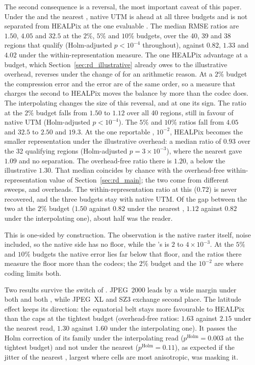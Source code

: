 The second consequence is a reversal, the most important caveat of this
paper. Under the  and the nearest , native UTM is
ahead at all three budgets and is not separated from HEALPix at the one
evaluable . The
median RMSE ratios are $1.50$, $4.05$ and $32.5$ at the $2\%$, $5\%$ and
$10\%$ budgets, over the 40, 39 and 38 regions that qualify
(Holm-adjusted $p<10^{-4}$ throughout), against $0.82$, $1.33$ and $4.02$
under the within-representation measure. The one HEALPix advantage at a budget, which
Section~\ref{sec:rd_illustrative} already owes to the illustrative
overhead, reverses under the change
of  for an arithmetic reason. At a $2\%$ budget the compression
error and the  error are of the same order, so a measure that
charges the second to HEALPix moves the balance by more than the codec
does. The interpolating  changes the size of this reversal, and at
one  its sign. The ratio at the $2\%$ budget falls from $1.50$ to
$1.12$ over all 40 regions, still in favour of native UTM (Holm-adjusted
$p<10^{-4}$). The $5\%$ and $10\%$ ratios fall from $4.05$ and $32.5$
to $2.50$ and $19.3$. At the one reportable , $10^{-2}$,
HEALPix becomes the smaller representation under the illustrative
overhead: a median ratio of $0.93$ over the 32 qualifying regions
(Holm-adjusted $p=3\times10^{-3}$), where the nearest  gave $1.09$
and no separation. The overhead-free ratio there is
$1.20$, a  below the illustrative $1.30$. That median
coincides by chance with the overhead-free within-representation value
of Section~\ref{sec:rd_main}; the two come from different sweeps,
 and overheads. The within-representation ratio at this
 ($0.72$) is never recovered, and the three budgets stay with
native UTM. Of the gap between the two  at the $2\%$ budget
($1.50$ against $0.82$ under the nearest , $1.12$ against $0.82$
under the interpolating one), about half was the reader.

This  is one-sided by construction. The observation is
the native raster itself, noise included, so the native side has no
floor, while the 's is $2$ to $4\times10^{-3}$. At the
$5\%$ and $10\%$ budgets the native error lies far below that floor, and
the ratios there measure the floor more than the codecs; the $2\%$
budget and the $10^{-2}$  are where coding
limits both.

Two results survive the switch of . JPEG~2000 leads by a wide
margin under both  and both , while JPEG~XL and SZ3
exchange second place. The latitude effect keeps its
direction: the equatorial belt stays more favourable to HEALPix than the
caps at the tightest budget (overhead-free ratios:
$1.63$ against $2.15$ under the nearest read, $1.30$ against $1.60$ under the interpolating one).
It passes the Holm correction of its family under the interpolating
read ($p^{\mathrm{Holm}}=0.003$ at the tightest budget) and not under the
nearest ($p^{\mathrm{Holm}}=0.11$), as expected if the jitter of the
nearest , largest where cells are most anisotropic, was
masking it.


